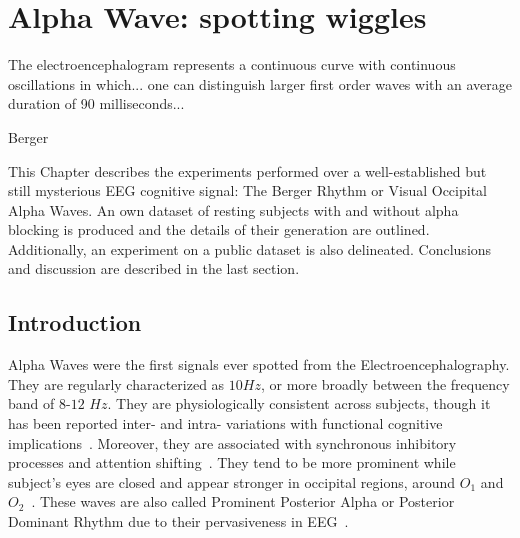 \chapter{Alpha Wave: spotting wiggles}
\label{chapter:four}
\epigraph{The electroencephalogram represents a continuous curve with continuous oscillations in which... one can distinguish larger first order waves with an average duration of 90 milliseconds...}{Berger}

This Chapter describes the experiments performed over a well-established but still mysterious EEG cognitive signal: The Berger Rhythm or Visual Occipital Alpha Waves.  An own dataset of resting subjects with and without alpha blocking is produced and the details of their generation are outlined.  Additionally, an experiment on a public dataset is also delineated.  Conclusions and discussion are described in the last section.

\section{Introduction}


Alpha Waves were the first signals ever spotted from the Electroencephalography.  They are regularly characterized as $10\si{Hz}$, or more broadly between the frequency band of $8$-$12$ $\si{Hz}$. They are physiologically consistent across subjects, though it has been reported inter- and intra- variations with functional cognitive implications~\cite{Haegens2014}.   Moreover, they are associated with synchronous inhibitory processes and attention shifting~\cite{c3}. They tend to be more prominent while subject's eyes are closed and appear stronger in occipital regions, around $O_1$ and $O_2$~\cite{WolpawJonathanR2012,Stopczynski2014}. These waves are also called Prominent Posterior Alpha or Posterior Dominant Rhythm due to their pervasiveness in EEG~\cite{Schomer2010,Haegens2014}.

